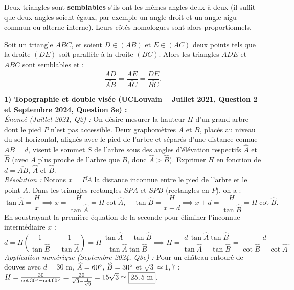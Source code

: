 Deux triangles sont \textbf{semblables} s'ils ont les mêmes angles deux à deux (il suffit que deux angles soient égaux, par exemple un angle droit et un angle aigu commun ou alterne-interne). Leurs côtés homologues sont alors proportionnels.

\begin{theoreme}
Soit un triangle $ABC$, et soient $D \in (AB)$ et $E \in (AC)$ deux points tels que la droite $(DE)$ soit parallèle à la droite $(BC)$. Alors les triangles $ADE$ et $ABC$ sont semblables et :
\[
    \boxed{\frac{\overline{AD}}{\overline{AB}} = \frac{\overline{AE}}{\overline{AC}} = \frac{\overline{DE}}{\overline{BC}}}.
\]
\end{theoreme}

\begin{exemple}
\textbf{1) Topographie et double visée (UCLouvain -- Juillet 2021, Question 2 et Septembre 2024, Question 3e) :}\\
\emph{Énoncé (Juillet 2021, Q2) :} On désire mesurer la hauteur $H$ d'un grand arbre dont le pied $P$ n'est pas accessible. Deux graphomètres $A$ et $B$, placés au niveau du sol horizontal, alignés avec le pied de l'arbre et séparés d'une distance connue $\overline{AB} = d$, visent le sommet $S$ de l'arbre sous des angles d'élévation respectifs $\widehat{A}$ et $\widehat{B}$ (avec $A$ plus proche de l'arbre que $B$, donc $\widehat{A} > \widehat{B}$). Exprimer $H$ en fonction de $d = \overline{AB}$, $\widehat{A}$ et $\widehat{B}$.\\
\emph{Résolution :} Notons $x = \overline{PA}$ la distance inconnue entre le pied de l'arbre et le point $A$. Dans les triangles rectangles $SPA$ et $SPB$ (rectangles en $P$), on a :
\[
    \tan\widehat{A} = \frac{H}{x} \implies x = \frac{H}{\tan\widehat{A}} = H\cot\widehat{A}, \quad \tan\widehat{B} = \frac{H}{x + d} \implies x + d = \frac{H}{\tan\widehat{B}} = H\cot\widehat{B}.
\]
En soustrayant la première équation de la seconde pour éliminer l'inconnue intermédiaire $x$ :
\[
    d = H\left(\frac{1}{\tan\widehat{B}} - \frac{1}{\tan\widehat{A}}\right) = H\,\frac{\tan\widehat{A} - \tan\widehat{B}}{\tan\widehat{A}\tan\widehat{B}} \implies \boxed{H = \frac{d\,\tan\widehat{A}\tan\widehat{B}}{\tan\widehat{A} - \tan\widehat{B}} = \frac{d}{\cot\widehat{B} - \cot\widehat{A}}}.
\]
\emph{Application numérique (Septembre 2024, Q3e) :} Pour un château entouré de douves avec $d = 30\text{ m}$, $\widehat{A} = 60\degree$, $\widehat{B} = 30\degree$ et $\sqrt{3} \simeq 1,7$ : $H = \frac{30}{\cot 30\degree - \cot 60\degree} = \frac{30}{\sqrt{3} - \frac{1}{\sqrt{3}}} = 15\sqrt{3} \simeq \boxed{25,5\text{ m}}$.


\end{exemple}
